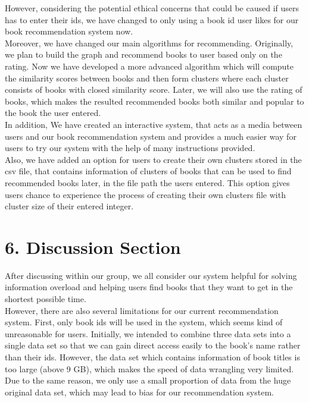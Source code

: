 \documentclass[fontsize=11pt]{article}
\begin{document}
However, considering the potential ethical concerns that could be caused if users has to enter their ids, we have changed to only using a book id user likes for our book recommendation system now.\\

Moreover, we have changed our main algorithms for recommending.
Originally, we plan to build the graph and recommend books to user based only on the rating. Now we have developed a more advanced algorithm which will compute the similarity scores between books and then form clusters where each cluster consists of books with closed similarity score. Later, we will also use the rating of books, which makes the resulted recommended books both similar and popular to the book the user entered.\\

In addition, We have created an interactive system, that acts as a media between users and our book recommendation system and provides a much easier way for users to try our system with the help of many instructions provided.\\

Also, we have added an option for users to create their own clusters stored in the csv file, that contains information of clusters of books that can be used to find recommended books later, in the file path the users entered. This option gives users chance to experience the process of creating their own clusters file with cluster size of their entered integer.\\

\section*{6. Discussion Section}

After discussing within our group, we all consider our system helpful for solving information overload and helping users find books that they want to get in the shortest possible time.\\

However, there are also several limitations for our current recommendation system. First, only book ids will be used in the system, which seems kind of unreasonable for users. Initially, we intended to combine three data sets into a single data set so that we can gain direct access easily to the book's name rather than their ids. However, the data set which contains information of book titles is too large (above 9 GB), which makes the speed of data wrangling very limited. Due to the same reason, we only use a small proportion of data from the huge original data set, which may lead to bias for our recommendation system.\\
\end{document}
